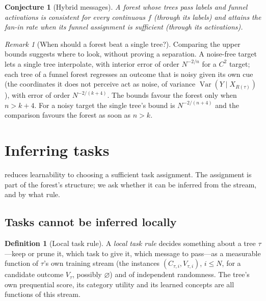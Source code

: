\documentclass[11pt]{article}
\newtheorem{conjecture}[theorem]{Conjecture}
\theoremstyle{definition}
\newtheorem{definition}[theorem]{Definition}
\theoremstyle{remark}
\newtheorem{remark}[theorem]{Remark}
\newcommand{\Var}{\operatorname{Var}}
\begin{document}
\begin{conjecture}[Hybrid messages]\label{conj:hybrid}
A forest whose trees pass labels and funnel activations is consistent for every
continuous $f$ (through its labels) and attains the fan-in rate when its funnel
assignment is sufficient (through its activations).
\end{conjecture}

\begin{remark}[When should a forest beat a single tree?]\label{rem:crossover}
Comparing the upper bounds suggests where to look, without proving a separation.  A
noise-free target lets a single tree interpolate, with interior error of order
$N^{-2/n}$ for a $C^2$ target; each tree of a funnel forest regresses an outcome that is
noisy given its own cue (the coordinates it does not perceive act as noise, of variance
$\Var(Y\mid X_{R(\tau)})$), with error of order $N^{-2/(k+4)}$.  The bounds favour the
forest only when $n>k+4$.  For a noisy target the single tree's bound is
$N^{-2/(n+4)}$ and the comparison favours the forest as soon as $n>k$.
\end{remark}

\section{Inferring tasks}\label{sec:infer}

 reduces learnability to choosing a sufficient task assignment.  The
assignment is part of the forest's structure; we ask whether it can be inferred from the
stream, and by what rule.

\subsection{Tasks cannot be inferred locally}

\begin{definition}[Local task rule]\label{def:local}
A \emph{local task rule} decides something about a tree $\tau$---keep or prune it,
which task to give it, which message to pass---as a measurable function of $\tau$'s own
training stream (the instances $(C_{\tau,i},V_{\tau,i})$, $i\le N$, for a candidate
outcome $V_\tau$, possibly $\varnothing$) and of independent randomness.  The tree's own
prequential score, its category utility and its learned concepts are all functions of
this stream.
\end{definition}
\end{document}
